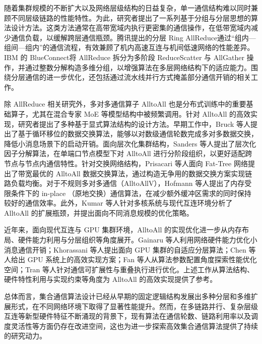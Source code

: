 随着集群规模的不断扩大以及网络层级结构的日益复杂，单一通信结构难以同时兼顾不同层级链路的性能特性。为此，研究者提出了一系列基于分组与分层思想的算法设计方法。这类方法通常在高带宽域内执行更密集的通信操作，在低带宽域内减少通信负载，以缓解跨层通信瓶颈。腾讯提出的分层 Ring AllReduce\cite{jia2018highly}通过“组内—组间—组内”的通信流程，有效兼顾了机内高速互连与机间低速网络的性能差异。IBM 的 BlueConnect\cite{cho2019blueconnect}将 AllReduce 拆分为多阶段 ReduceScatter 与 AllGather 操作，并通过整数分解构造多维分组，以增强算法在多层网络结构下的适应能力。围绕分层通信的进一步优化，还包括通过流水线并行方式掩盖部分通信开销的相关工作\cite{thao2021efficient}。

除 AllReduce 相关研究外，多对多通信算子 AlltoAll 也是分布式训练中的重要基础算子，尤其在混合专家 MoE 等模型结构中被频繁调用。针对 AlltoAll 的高效实现，研究者提出了多种基于显式算法结构的设计方法。早期工作中，Bruck 等人\cite{bruck1994efficient}提出了基于循环移位的数据交换算法，能够以对数级通信轮数完成多对多数据交换，降低小消息场景下的启动开销。面向层次化集群结构，Sanders 等人\cite{sanders2002hierarchical}提出了层次化因子分解算法，在单端口节点模型下对 AlltoAll 进行分阶段组织，以更好适配跨节点与节点内通信特性。针对交换网络结构，Prisacari 等人\cite{prisacari2013bandwidth}面向 Fat-Tree 网络提出了带宽最优的 AlltoAll 数据交换算法，通过构造无争用的数据交换方案实现链路负载均衡。对于不规则多对多通信（AlltoAllV），Hofmann 等人\cite{hofmann2010place}提出了内存受限条件下的 in-place （原地交换）通信算法，在减少额外缓冲区需求的同时保持较好的通信效率。此外，Kumar 等人\cite{kumar2008scaling}针对多核系统与现代互连环境分析了 AlltoAll 的扩展瓶颈，并提出面向不同消息规模的优化策略。

近年来，面向现代互连与 GPU 集群环境，AlltoAll 的实现优化进一步从内存布局、硬件能力利用与分层组织等角度展开。Gainaru 等人\cite{gainaru2016using}利用网络硬件能力优化小消息通信开销；Khorassani 等人\cite{khorassani2021adaptive}提出面向 GPU 集群的自适应分层算法；Chen 等人\cite{chen2022highly}给出 GPU 系统上的高效实现方案；Fan 等人\cite{fan2024configurable}从算法参数配置角度探索性能优化空间；Tran 等人\cite{tran2024ohio}针对通信可扩展性与重叠执行进行优化。上述工作从算法结构、硬件特性利用与实现约束等角度为 AlltoAll 的高效实现提供了参考。

总体而言，集合通信算法设计已经从早期的固定逻辑结构发展出多种分层和多维扩展形式，在不同网络环境下取得了显著性能提升。然而，在多链路并行、复杂层级互连等新型硬件特征不断涌现的背景下，现有算法在通信轮数、链路利用率以及调度灵活性等方面仍存在改进空间，这也为进一步探索高效集合通信算法提供了持续的研究动力。



